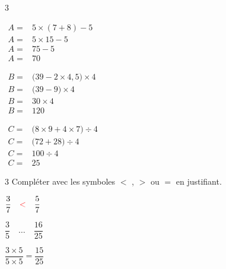 \documentclass[a4paper]{book}
\begin{document}
{\begin{exerciceNote}{3}
        \begin{minipage}{0.3\linewidth}
            $\begin{array}{ll}
                A = & 5\times(7+8)-5 \\[2ex]
                A = & 5\times15-5\\[2ex]
                A = & 75-5\\[2ex]
                A = & 70
            \end{array}$
        \end{minipage}
        \vline
        \begin{minipage}{0.35\linewidth}
            $\begin{array}{ll}
                B = & \big(39-2\times4,5\big)\times4 \\[2ex]
                B = & \big(39-9\big)\times4\\[2ex]
                B = & 30\times4\\[2ex]
                B = & 120
            \end{array}$
        \end{minipage}
        \vline
        \begin{minipage}{0.3\linewidth}
            $\begin{array}{ll}
                C = & \big(8\times9+4\times7\big)\div4 \\[2ex]
                C = & \big(72+28\big)\div4\\[2ex]
                C = & 100\div4\\[2ex]
                C = & 25
            \end{array}$
        \end{minipage}
    \end{exerciceNote}


    \begin{exerciceNote}{3}
        Compléter avec les symboles $<$ , $>$ ou $=$ en justifiant.

        \medskip
        
        \begin{minipage}{0.24\linewidth}
            $\dfrac{3}{7} \quad \textcolor{red}{<} \quad \dfrac{5}{7}$
        \end{minipage}
        \hfill\vline\hfill
        \begin{minipage}{0.24\linewidth}
            $\dfrac{3}{5} \quad \dots \quad \dfrac{16}{25}$

            \medskip

            $\dfrac{3\times5}{5\times5}=\dfrac{15}{25}$


\end{minipage}
\end{exerciceNote}}
\end{document}
